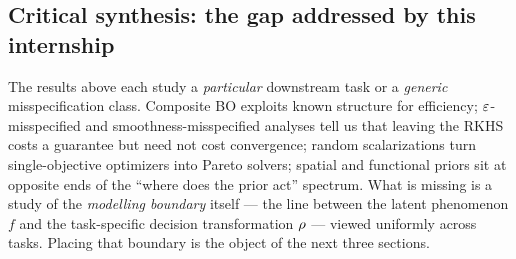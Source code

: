 \subsection{Critical synthesis: the gap addressed by this internship}
\label{sec:bg-synthesis}

The results above each study a \emph{particular} downstream task or a
\emph{generic} misspecification class. Composite BO exploits known structure for
efficiency; $\varepsilon$-misspecified and smoothness-misspecified analyses tell us that
leaving the RKHS costs a guarantee but need not cost convergence; random
scalarizations turn single-objective optimizers into Pareto solvers; spatial and
functional priors sit at opposite ends of the ``where does the prior act''
spectrum. What is missing is a study of the \emph{modelling boundary} itself ---
the line between the latent phenomenon $f$ and the task-specific decision
transformation $\rho$ --- viewed uniformly across tasks. Placing that boundary is
the object of the next three sections.
